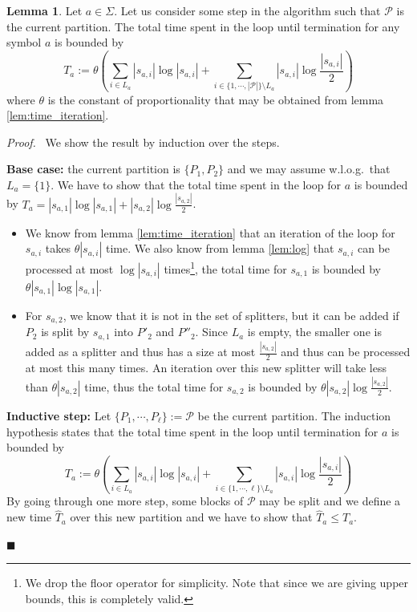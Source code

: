 \documentclass[12pt, a4 paper]{article}
\renewenvironment{proof}[1][Proof]{\begin{mdframed}[backgroundcolor=black!5, topline=false, rightline=false, bottomline=false, linecolor=black!15, linewidth=3pt]{\noindent\textit{#1.}\ }}{\noindent\par\hfill$\blacksquare$\end{mdframed}}
\theoremstyle{definition}
\newtheorem{lemma}{Lemma}
\begin{document}
\begin{lemma}\label{lem:bound}
    Let $a \in \Sigma$. Let us consider some step in the algorithm such that $\mathcal{P}$ is the current partition. The total time spent in the loop until termination for any symbol $a$ is bounded by
    $$ T_a := \theta \left(\sum_{i \in L_a} \left| s_{a, i} \right| \log \left| s_{a, i} \right| + \sum_{i \in \{1, \cdots, |\mathcal{P}|\}\setminus L_a} \left| s_{a, i} \right| \log \frac{\left| s_{a, i} \right|}{2} \right)$$
    where $\theta$ is the constant of proportionality that may be obtained from lemma \ref{lem:time_iteration}.
\end{lemma}
\begin{proof}
    We show the result by induction over the steps.

    \bigskip
    \textbf{Base case:} the current partition is $\{P_1, P_2\}$ and we may assume w.l.o.g.\ that $L_a = \{1\}$.
    We have to show that the total time spent in the loop for $a$ is bounded by $T_a = \left| s_{a, 1} \right| \log \left| s_{a, 1} \right| + \left| s_{a, 2} \right| \log \frac{\left| s_{a, 2} \right|}{2}$.
    \begin{itemize}
        \item We know from lemma \ref{lem:time_iteration} that an iteration of the loop for $s_{a, i}$ takes $\theta\left| s_{a,i} \right|$ time. We also know from lemma \ref{lem:log} that $s_{a, i}$ can be processed at most $\log \left| s_{a, i} \right|$ times\footnote{We drop the floor operator for simplicity. Note that since we are giving upper bounds, this is completely valid.}, the total time for $s_{a, 1}$ is bounded by $\theta \left| s_{a, 1} \right| \log \left| s_{a, 1} \right|$.

        \item For $s_{a, 2}$, we know that it is not in the set of splitters, but it can be added if $P_2$ is split by $s_{a, 1}$ into $P'_2$ and $P''_2$. Since $L_a$ is empty, the smaller one is added as a splitter and thus has a size at most $\frac{\left| s_{a, 2} \right|}{2}$ and thus can be processed at most this many times. An iteration over this new splitter will take less than $\theta \left| s_{a, 2} \right|$ time, thus the total time for $s_{a, 2}$ is bounded by $\theta \left| s_{a, 2} \right| \log \frac{\left| s_{a, 2} \right|}{2}$.
    \end{itemize}

    \textbf{Inductive step:} Let $\{P_1, \cdots, P_\ell\} := \mathcal{P}$ be the current partition. The induction hypothesis states that the total time spent in the loop until termination for $a$ is bounded by
    $$ T_a := \theta \left(\sum_{i \in L_a} \left| s_{a, i} \right| \log \left| s_{a, i} \right| + \sum_{i \in \{1, \cdots, \ell\}\setminus L_a} \left| s_{a, i} \right| \log \frac{\left| s_{a, i} \right|}{2} \right)$$
    By going through one more step, some blocks of $\mathcal{P}$ may be split and we define a new time $\hat{T}_a$ over this new partition and we have to show that $\hat{T}_a \leq T_a$.


\end{proof}
\end{document}
